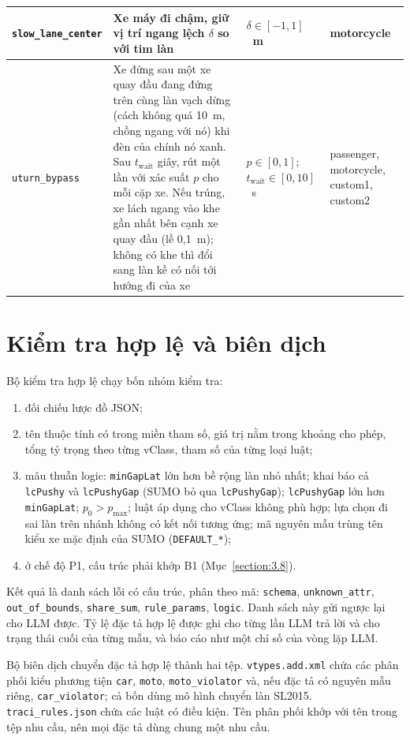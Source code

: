 \documentclass[../DoAn.tex]{subfiles}
\begin{document}
\begin{table}[ht]
\begin{tabular}{|p{2.6cm}|p{5.2cm}|p{3.3cm}|p{2.1cm}|}
\texttt{slow\_\allowbreak lane\_\allowbreak center} & Xe máy đi chậm, giữ vị trí ngang lệch $\delta$ so với tim làn & $\delta \in [-1,1]$~m & motorcycle \\ \hline
\texttt{uturn\_\allowbreak bypass} & Xe đứng sau một xe quay đầu đang đứng trên cùng làn vạch dừng (cách không quá 10~m, chồng ngang với nó) khi đèn của chính nó xanh. Sau $t_{\text{wait}}$ giây, rút một lần với xác suất $p$ cho mỗi cặp xe. Nếu trúng, xe lách ngang vào khe gần nhất bên cạnh xe quay đầu (lề 0,1~m); không có khe thì đổi sang làn kề có nối tới hướng đi của xe & $p \in [0,1]$; $t_{\text{wait}} \in [0,10]$~s & passenger, motorcycle, custom1, custom2 \\ \hline
\end{tabular}
\end{table}

\section{Kiểm tra hợp lệ và biên dịch}
\label{section:3.4}

Bộ kiểm tra hợp lệ chạy bốn nhóm kiểm tra:
\begin{enumerate}[label=(\arabic*)]
    \item đối chiếu lược đồ JSON;
    \item tên thuộc tính có trong miền tham số, giá trị nằm trong khoảng cho phép, tổng tỷ trọng theo từng vClass, tham số của từng loại luật;
    \item mâu thuẫn logic: \texttt{minGapLat} lớn hơn bề rộng làn nhỏ nhất; khai báo cả \texttt{lcPushy} và \texttt{lcPushyGap} (SUMO bỏ qua \texttt{lcPushyGap}); \texttt{lcPushyGap} lớn hơn \texttt{minGapLat}; $p_0 > p_{\max}$; luật áp dụng cho vClass không phù hợp; lựa chọn đi sai làn trên nhánh không có kết nối tương ứng; mã nguyên mẫu trùng tên kiểu xe mặc định của SUMO (\texttt{DEFAULT\_*});
    \item ở chế độ P1, cấu trúc phải khớp B1 (Mục~\ref{section:3.8}).
\end{enumerate}
Kết quả là danh sách lỗi có cấu trúc, phân theo mã: \texttt{schema}, \texttt{unknown\_attr}, \texttt{out\_of\_bounds}, \texttt{share\_sum}, \texttt{rule\_params}, \texttt{logic}. Danh sách này gửi ngược lại cho LLM được. Tỷ lệ đặc tả hợp lệ được ghi cho từng lần LLM trả lời và cho trạng thái cuối của từng mẫu, và báo cáo như một chỉ số của vòng lặp LLM.

Bộ biên dịch chuyển đặc tả hợp lệ thành hai tệp. \texttt{vtypes.add.xml} chứa các phân phối kiểu phương tiện \texttt{car}, \texttt{moto}, \texttt{moto\_violator} và, nếu đặc tả có nguyên mẫu riêng, \texttt{car\_violator}; cả bốn dùng mô hình chuyển làn SL2015. \texttt{traci\_rules.json} chứa các luật có điều kiện. Tên phân phối khớp với tên trong tệp nhu cầu, nên mọi đặc tả dùng chung một nhu cầu.
\end{document}
